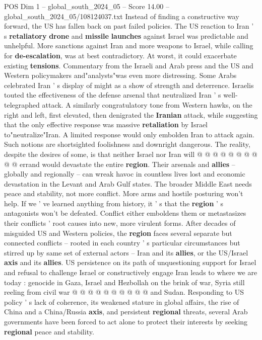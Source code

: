 \begin{textsample}{POS Dim 1 – global\_south\_2024\_05 – Score 14.00 – global\_south\_2024\_05/108124037.txt}  \label{ex:f1_pos_248}
Instead of finding a constructive way forward, the US has fallen back on past failed policies.
The US reaction to Iran ' s \textbf{retaliatory} \textbf{drone} and \textbf{missile} \textbf{launches} against Israel was predictable and unhelpful.
More sanctions against Iran and more weapons to Israel, while calling for \textbf{de-escalation}, was at best contradictory.
At worst, it could exacerbate existing \textbf{tensions}.
Commentary from the Israeli and Arab press and the US and Western policymakers and"analysts"was even more distressing.
Some Arabs celebrated Iran ' s display of might as a show of strength and deterrence.
Israelis touted the effectiveness of the defense arsenal that neutralized Iran ' s well-telegraphed attack.
A similarly congratulatory tone from Western hawks, on the right and left, first elevated, then denigrated the \textbf{Iranian} attack, while suggesting that the only effective response was massive \textbf{retaliation} by Israel to"neutralize"Iran.
A limited response would only embolden Iran to attack again.
Such notions are shortsighted foolishness and downright dangerous.
The reality, despite the desires of some, is that neither Israel nor Iran will @ @ @ @ @ @ @ @ @ @ errand would devastate the entire \textbf{region}.
Their arsenals and \textbf{allies} -- globally and regionally -- can wreak havoc in countless lives lost and economic devastation in the Levant and Arab Gulf states.
The broader Middle East needs peace and stability, not more conflict.
More arms and hostile posturing won't help.
If we ' ve learned anything from history, it ' s that the \textbf{region} ' s antagonists won't be defeated.
Conflict either emboldens them or metastasizes their conflicts ' root causes into new, more virulent forms.
After decades of misguided US and Western policies, the \textbf{region} faces several separate but connected conflicts -- rooted in each country ' s particular circumstances but stirred up by same set of external actors -- Iran and its \textbf{allies}, or the US/Israel \textbf{axis} and its \textbf{allies}.
US persistence on its path of unquestioning support for Israel and refusal to challenge Israel or constructively engage Iran leads to where we are today : genocide in Gaza, Israel and Hezbollah on the brink of war, Syria still reeling from civil war @ @ @ @ @ @ @ @ @ @ and Sudan.
Responding to US policy ' s lack of coherence, its weakened stature in global affairs, the rise of China and a China/Russia \textbf{axis}, and persistent \textbf{regional} threats, several Arab governments have been forced to act alone to protect their interests by seeking \textbf{regional} peace and stability.

\end{textsample}
